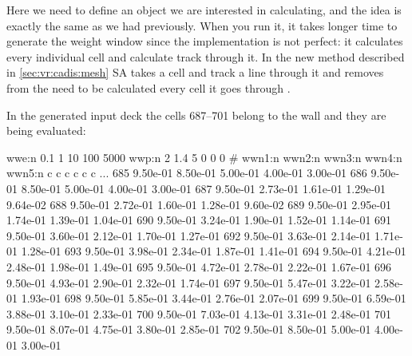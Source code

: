 \begin{description}

\end{description}

Here we need to define an object we are interested in calculating, and the idea is exactly the same as we had previously.
When you run it, it takes longer time to generate the weight window since the implementation is not perfect: it calculates every individual cell and calculate track through it.
In the new method described in \ref{sec:vr:cadis:mesh} SA takes a cell and track a line through it and removes from the need to be calculated every cell it goes through .

In the generated input deck the cells 687--701 belong to the wall and they are being evaluated:
\begin{deck}
wwe:n 0.1 1 10 100 5000
wwp:n 2 1.4 5 0 0 0
#   wwn1:n  wwn2:n  wwn3:n  wwn4:n  wwn5:n
c   c        c        c        c        c
...
685   9.50e-01 8.50e-01 5.00e-01 4.00e-01 3.00e-01
686   9.50e-01 8.50e-01 5.00e-01 4.00e-01 3.00e-01
687   9.50e-01 2.73e-01 1.61e-01 1.29e-01 9.64e-02
688   9.50e-01 2.72e-01 1.60e-01 1.28e-01 9.60e-02
689   9.50e-01 2.95e-01 1.74e-01 1.39e-01 1.04e-01
690   9.50e-01 3.24e-01 1.90e-01 1.52e-01 1.14e-01
691   9.50e-01 3.60e-01 2.12e-01 1.70e-01 1.27e-01
692   9.50e-01 3.63e-01 2.14e-01 1.71e-01 1.28e-01
693   9.50e-01 3.98e-01 2.34e-01 1.87e-01 1.41e-01
694   9.50e-01 4.21e-01 2.48e-01 1.98e-01 1.49e-01
695   9.50e-01 4.72e-01 2.78e-01 2.22e-01 1.67e-01
696   9.50e-01 4.93e-01 2.90e-01 2.32e-01 1.74e-01
697   9.50e-01 5.47e-01 3.22e-01 2.58e-01 1.93e-01
698   9.50e-01 5.85e-01 3.44e-01 2.76e-01 2.07e-01
699   9.50e-01 6.59e-01 3.88e-01 3.10e-01 2.33e-01
700   9.50e-01 7.03e-01 4.13e-01 3.31e-01 2.48e-01
701   9.50e-01 8.07e-01 4.75e-01 3.80e-01 2.85e-01
702   9.50e-01 8.50e-01 5.00e-01 4.00e-01 3.00e-01
\end{deck}

